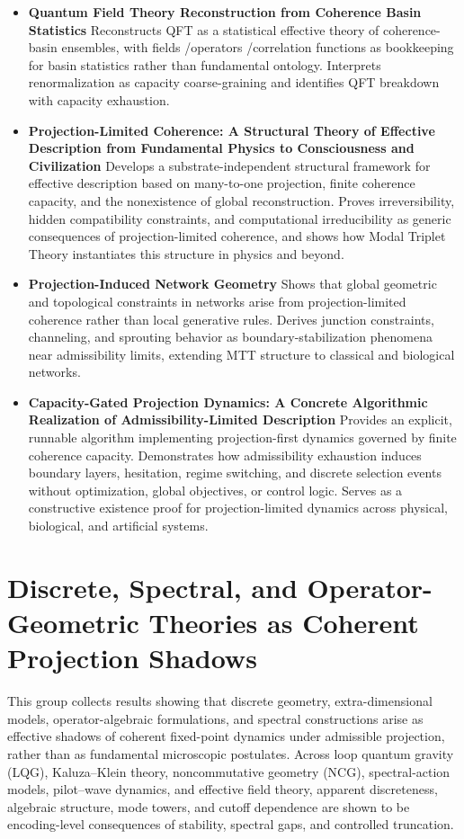 \documentclass[11pt]{article}
\begin{document}
\begin{itemize}
\item \textbf{Quantum Field Theory Reconstruction from Coherence Basin Statistics}
Reconstructs QFT as a statistical effective theory of coherence-basin ensembles, with fields /operators /correlation functions as bookkeeping for basin statistics rather than fundamental ontology. Interprets renormalization as capacity coarse-graining and identifies QFT breakdown with capacity exhaustion.
\item \textbf{Projection-Limited Coherence: A Structural Theory of Effective Description from Fundamental Physics to Consciousness and Civilization}
Develops a substrate-independent structural framework for effective description based on many-to-one projection, finite coherence capacity, and the nonexistence of global reconstruction. Proves irreversibility, hidden compatibility constraints, and computational irreducibility as generic consequences of projection-limited coherence, and shows how Modal Triplet Theory instantiates this structure in physics and beyond.

\item \textbf{Projection-Induced Network Geometry}
Shows that global geometric and topological constraints in networks arise from projection-limited coherence rather than local generative rules. Derives junction constraints, channeling, and sprouting behavior as boundary-stabilization phenomena near admissibility limits, extending MTT structure to classical and biological networks.
\item \textbf{Capacity-Gated Projection Dynamics: A Concrete Algorithmic Realization of Admissibility-Limited Description} 
Provides an explicit, runnable algorithm implementing projection-first dynamics governed by finite coherence capacity. Demonstrates how admissibility exhaustion induces boundary layers, hesitation, regime switching, and discrete selection events without optimization, global objectives, or control logic. Serves as a constructive existence proof for projection-limited dynamics across physical, biological, and artificial systems.


\end{itemize}


\section{Discrete, Spectral, and Operator-Geometric Theories as Coherent Projection Shadows}
This group collects results showing that discrete geometry, extra-dimensional models,
operator-algebraic formulations, and spectral constructions arise as effective shadows
of coherent fixed-point dynamics under admissible projection, rather than as fundamental
microscopic postulates. Across loop quantum gravity (LQG), Kaluza--Klein theory,
noncommutative geometry (NCG), spectral-action models, pilot--wave dynamics, and
effective field theory, apparent discreteness, algebraic structure, mode towers, and
cutoff dependence are shown to be encoding-level consequences of stability, spectral
gaps, and controlled truncation.
\end{document}
